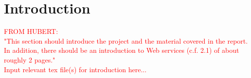 \chapter{Introduction}
\textcolor{red}{FROM HUBERT:\\
"This section should introduce the project and the material covered in the report. In addition, there should be an introduction to Web services (c.f. 2.1) of about roughly 2 pages."\\
Input relevant tex file(s) for introduction here...}



